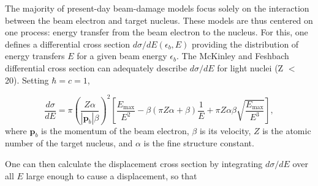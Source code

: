 \documentclass{article}
\begin{document}
The majority of present-day beam-damage models focus solely on the interaction
between the beam electron and target nucleus.
These models are thus centered on one process: energy transfer from the beam
electron to the nucleus.
For this, one defines a differential cross section $d\sigma/dE(\epsilon_b, E)$
providing the distribution of energy transfers $E$ for a given beam energy
$\epsilon_b$.
The McKinley and Feshbach differential cross section can adequately describe
$d\sigma/dE$
for light nuclei (Z $<$ 20).\cite{Mott1929, McKinley1948, Oen1973,
Egerton2010}  Setting $\hbar = c = 1$,

\begin{equation}
  \frac{d\sigma}{dE}
  =
  \pi\left(\frac{Z\alpha}{|\mathbf{p}_b|\beta}\right)^2
  \left[
    \frac{E_\text{max}}{E^2}
    - \beta(\pi Z\alpha+\beta)\frac{1}{E}
    + \pi Z\alpha\beta\sqrt{\frac{E_\text{max}}{E^3}}
  \right],
  \label{eq:MF}
\end{equation}
%
where $\mathbf{p}_b$ is the momentum of the beam electron, $\beta$ is its
velocity, $Z$ is the atomic number of the target nucleus, and $\alpha$ is the
fine structure constant.

One can then calculate the displacement cross section by integrating
$d\sigma/dE$ over all $E$ large enough to cause a displacement, so that
\end{document}
